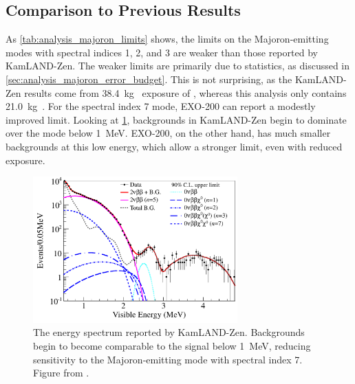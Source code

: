 \documentclass[herrin-thesis.tex]{subfiles}
\begin{document}
\subsection{Comparison to Previous Results}
As \cref{tab:analysis_majoron_limits} shows, the limits on the Majoron-emitting modes with spectral indices 1, 2, and 3 are weaker than those reported by KamLAND-Zen. The weaker limits are primarily due to statistics, as discussed in \cref{sec:analysis_majoron_error_budget}. This is not surprising, as the KamLAND-Zen results come from \SI{38.4}{\kg\year} exposure of , whereas this analysis only contains \SI{21.0}{\kg\year}. For the spectral index 7 mode, EXO-200 can report a modestly improved limit. Looking at \cref{fig:analysis_kamlandzen_spectrum}, backgrounds in KamLAND-Zen begin to dominate over the \twonu{} mode below \SI{1}{\MeV}. EXO-200, on the other hand, has much smaller backgrounds at this low energy, which allow a stronger limit, even with reduced exposure.

\begin{figure}[htp]
\centering
\includegraphics[width=0.7\textwidth]{./plots/analysis_kamlandzen_spectrum.pdf}
\caption[KamLAND-Zen spectrum for Majoron-emitting modes]{The energy spectrum reported by KamLAND-Zen. Backgrounds begin to become comparable to the \twonu{} signal below \SI{1}{\MeV}, reducing sensitivity to the Majoron-emitting mode with spectral index 7. Figure from \cite{Gando:2012fk}.}
\label{fig:analysis_kamlandzen_spectrum}
\end{figure}
\end{document}
